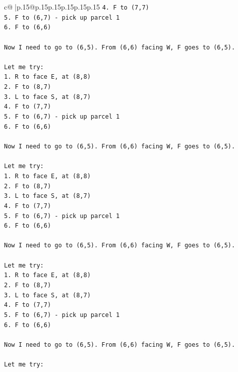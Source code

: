 \documentclass{article}
\begin{document}
{\begin{supertabular}{c@{$\;$}|p{.15\linewidth}@{}p{.15\linewidth}p{.15\linewidth}p{.15\linewidth}p{.15\linewidth}p{.15\linewidth}}
{{{\texttt{4. F to (7,7)} \\
\texttt{5. F to (6,7) {-} pick up parcel 1} \\
\texttt{6. F to (6,6)} \\
\\ 
\texttt{Now I need to go to (6,5). From (6,6) facing W, F goes to (6,5).} \\
\\ 
\texttt{Let me try:} \\
\texttt{1. R to face E, at (8,8)} \\
\texttt{2. F to (8,7)} \\
\texttt{3. L to face S, at (8,7)} \\
\texttt{4. F to (7,7)} \\
\texttt{5. F to (6,7) {-} pick up parcel 1} \\
\texttt{6. F to (6,6)} \\
\\ 
\texttt{Now I need to go to (6,5). From (6,6) facing W, F goes to (6,5).} \\
\\ 
\texttt{Let me try:} \\
\texttt{1. R to face E, at (8,8)} \\
\texttt{2. F to (8,7)} \\
\texttt{3. L to face S, at (8,7)} \\
\texttt{4. F to (7,7)} \\
\texttt{5. F to (6,7) {-} pick up parcel 1} \\
\texttt{6. F to (6,6)} \\
\\ 
\texttt{Now I need to go to (6,5). From (6,6) facing W, F goes to (6,5).} \\
\\ 
\texttt{Let me try:} \\
\texttt{1. R to face E, at (8,8)} \\
\texttt{2. F to (8,7)} \\
\texttt{3. L to face S, at (8,7)} \\
\texttt{4. F to (7,7)} \\
\texttt{5. F to (6,7) {-} pick up parcel 1} \\
\texttt{6. F to (6,6)} \\
\\ 
\texttt{Now I need to go to (6,5). From (6,6) facing W, F goes to (6,5).} \\
\\ 
\texttt{Let me try:} \\
}}}
\end{supertabular}}
\end{document}
